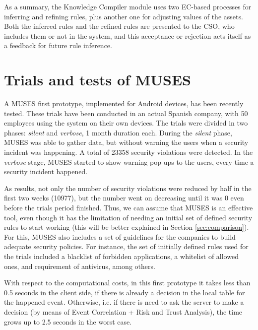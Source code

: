 As a summary, the Knowledge Compiler module uses two EC-based processes for inferring and refining rules, plus another one for adjusting values of the assets. Both the inferred rules and the refined rules are presented to the CSO, who includes them or not in the system, and this acceptance or rejection acts itself as a feedback for future rule inference.



\section{Trials and tests of MUSES}
\label{subsec:trials}

A MUSES first prototype, implemented for Android devices, has been recently tested. These trials have been conducted in an actual Spanish company, with 50 employees using the system on their own devices.
The trials were divided in two phases: \textit{silent} and \textit{verbose}, 1 month duration each. During the \textit{silent} phase, MUSES was able to gather data, but without warning the users when a security incident was happening. A total of 23358 security violations were detected. In the \textit{verbose} stage, MUSES started to show warning pop-ups to the users, every time a security incident happened. 

As results, not only the number of security violations were reduced by half in the first two weeks (10977), but the number went on decreasing until it was 0 even before the trials period finished. Thus, we can assume that MUSES is an effective tool, even though it has the limitation of needing an initial set of defined security rules to start working (this will be better explained in Section \ref{sec:comparison}). For this, MUSES also includes a set of guidelines for the companies to build adequate security policies. For instance, the set of initially defined rules used for the trials included a blacklist of forbidden applications, a whitelist of allowed ones, and requirement of antivirus, among others.

With respect to the computational costs, in this first prototype it takes less than 0.5 seconds in the client side, if there is already a decision in the local table for the happened event. Otherwise, i.e. if there is need to ask the server to make a decision (by means of Event Correlation + Risk and Trust Analysis), the time grows up to 2.5 seconds in the worst case.